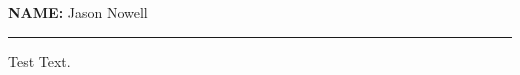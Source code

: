 \documentclass{article}
\newcommand{\myName}{Jason Nowell}
\begin{document}
{\huge \bfseries NAME:} \myName \hspace{-5.1cm}

{\vspace{-10pt}\rule{0.5\textwidth}{1.4pt} }

Test Text.
\end{document}
